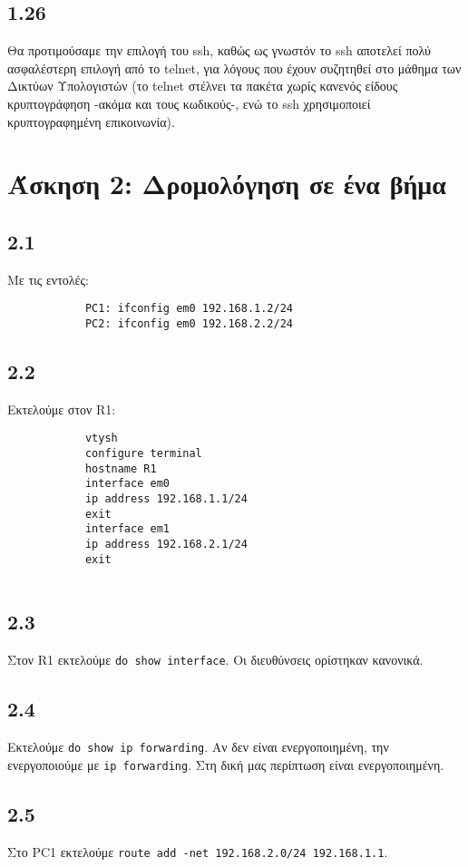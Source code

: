 \documentclass[a4paper, 12pt]{article}
\begin{document}
	\subsection*{1.26}
		Θα προτιμούσαμε την επιλογή του ssh, καθώς ως γνωστόν το ssh αποτελεί πολύ ασφαλέστερη επιλογή από το telnet, για λόγους που έχουν συζητηθεί στο μάθημα των Δικτύων Υπολογιστών (το telnet στέλνει τα πακέτα χωρίς κανενός είδους κρυπτογράφηση -ακόμα και τους κωδικούς-, ενώ το ssh χρησιμοποιεί κρυπτογραφημένη επικοινωνία).

\section*{Άσκηση 2: Δρομολόγηση σε ένα βήμα}

	\subsection*{2.1}
		Με τις εντολές:
		
		\begin{verbatim}
			PC1: ifconfig em0 192.168.1.2/24 
			PC2: ifconfig em0 192.168.2.2/24
		\end{verbatim}

	\subsection*{2.2}
		Εκτελούμε στον R1:
		
		\begin{verbatim}
			vtysh
			configure terminal
			hostname R1
			interface em0
			ip address 192.168.1.1/24
			exit
			interface em1
			ip address 192.168.2.1/24
			exit
			
		\end{verbatim}

	\subsection*{2.3}
		Στον R1 εκτελούμε \verb|do show interface|. Οι διευθύνσεις ορίστηκαν κανονικά.

	\subsection*{2.4}
		Εκτελούμε \verb|do show ip forwarding|. Αν δεν είναι ενεργοποιημένη, την ενεργοποιούμε με \verb|ip forwarding|. Στη δική μας περίπτωση είναι ενεργοποιημένη.

	\subsection*{2.5}
		Στο PC1 εκτελούμε \verb|route add -net 192.168.2.0/24 192.168.1.1|.
\end{document}

